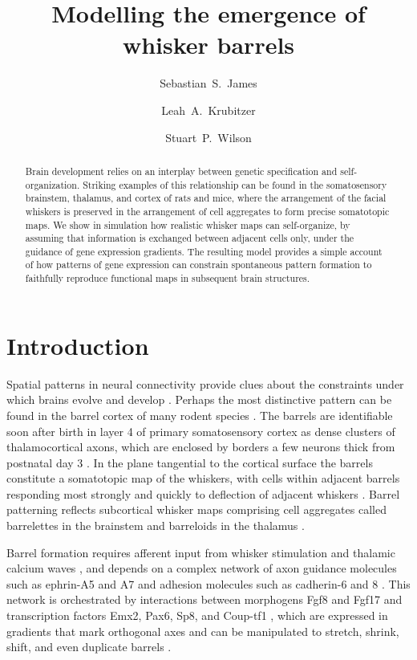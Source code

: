 \documentclass[9pt,lineno]{elife}
\title{Modelling the emergence of whisker barrels}
\author[1*]{Sebastian~S.~James}
\author[2]{Leah~A.~Krubitzer}
\author[1]{Stuart~P.~Wilson}
\affil[1]{Department of Psychology, The University of Sheffield, Sheffield, United Kingdom.}
\affil[2]{Center for Neuroscience, The University of California, Davis, United States.}
\begin{document}
\maketitle

\begin{abstract}
Brain development relies on an interplay between genetic specification and
self-organization. Striking examples of this relationship can be found in the
somatosensory brainstem, thalamus, and cortex of rats and mice, where the
arrangement of the facial whiskers is preserved in the arrangement of cell
aggregates to form precise somatotopic maps. We show in simulation how
realistic whisker maps can self-organize, by assuming that information is
exchanged between adjacent cells only, under the guidance of gene expression
gradients. The resulting model provides a simple account of how patterns of
gene expression can constrain spontaneous pattern formation to faithfully
reproduce functional maps in subsequent brain structures.
\end{abstract}

\section{Introduction}

Spatial patterns in neural connectivity provide clues about the constraints
under which brains evolve and develop \citep{purves_iterated_1992}. Perhaps
the most distinctive pattern can be found in the barrel cortex of many rodent
species \citep{woolsey_structural_1970}. The barrels are identifiable soon
after birth in layer 4 of primary somatosensory cortex as dense clusters of
thalamocortical axons, which are enclosed by borders a few neurons thick from
postnatal day 3 \citep{erzurumlu_development_2012}. In the plane tangential to
the cortical surface the barrels constitute a somatotopic map of the whiskers,
with cells within adjacent barrels responding most strongly and quickly to
deflection of adjacent whiskers \citep{armstrong-james_flow_1992}. Barrel
patterning reflects subcortical whisker maps comprising cell aggregates called
barrelettes in the brainstem and barreloids in the thalamus
\citep{ma_barrelettesarchitectonic_1991,van_der_loos_barreloids_1976}.

Barrel formation requires afferent input from whisker stimulation and thalamic
calcium waves \citep{anton-bolanos_prenatal_2019}, and depends on a complex
network of axon guidance molecules such as ephrin-A5 and A7 and adhesion
molecules such as cadherin-6 and 8
\citep{vanderhaeghen_mapping_2000,miller_epha7-ephrin-a5_2006}.  This network
is orchestrated by interactions between morphogens Fgf8 and Fgf17 and
transcription factors Emx2, Pax6, Sp8, and Coup-tf1
\citep{shimogori_fibroblast_2005,bishop_regulation_2000}, which are expressed
in gradients that mark orthogonal axes and can be manipulated to stretch,
shrink, shift, and even duplicate barrels
\citep{assimacopoulos_fibroblast_2012}.
\end{document}
